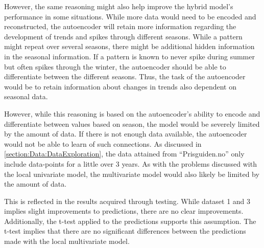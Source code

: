 However, the same reasoning might also help improve the hybrid model's performance in some situations.
While more data would need to be encoded and reconstructed, the autoencoder will retain more information
regarding the development of trends and spikes through different seasons.
While a pattern might repeat over several seasons, there might be additional hidden information in the seasonal information.
If a pattern is known to never spike during summer but often spikes through the winter,
the autoencoder should be able to differentiate between the different seasons.
Thus, the task of the autoencoder would be to retain information about changes in trends also dependent on seasonal data.


However, while this reasoning is based on the autoencoder's ability to encode and differentiate between values based on season,
the model would be severely limited by the amount of data.
If there is not enough data available, the autoencoder would not be able to learn of such connections.
As discussed in \cref{section:Data:DataExploration}, the data attained from ``Prisguiden.no'' only include data-points
for a little over 3 years.
As with the problems discussed with the local univariate model, the multivariate model would also likely be limited by the amount of data.

This is reflected in the results acquired through testing.
While dataset 1 and 3 implies slight improvements to predictions, there are no clear improvements.
Additionally, the t-test applied to the predictions supports this assumption.
The t-test implies that there are no significant differences between the predictions made with the local multivariate model.


